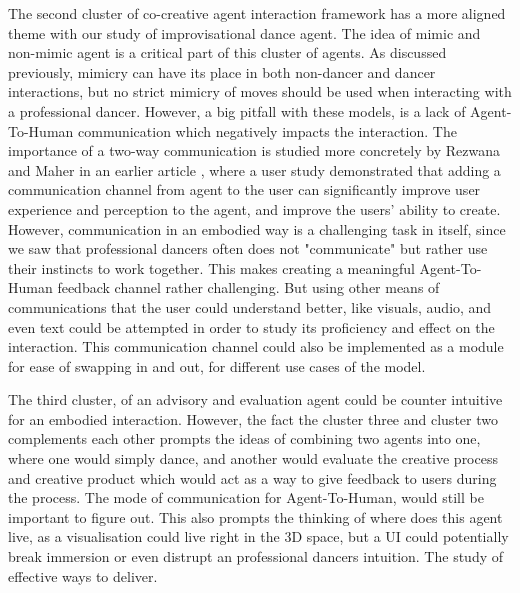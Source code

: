 \documentclass[final,5p,times,twocolumn,authoryear]{article}
\begin{document}
The second cluster of co-creative agent interaction framework has a more
aligned theme with our study of improvisational dance agent. The idea of
mimic and non-mimic agent is a critical part of this cluster of agents.
As discussed previously, mimicry can have its place in both non-dancer
and dancer interactions, but no strict mimicry of moves should be used
when interacting with a professional dancer. However, a big pitfall with
these models, is a lack of Agent-To-Human communication which negatively impacts
the interaction. The importance of a two-way communication is studied
more concretely by Rezwana and Maher in an earlier article
\cite{Rezwana2022}, where a user study demonstrated that adding a
communication channel from agent to the user can significantly improve
user experience and perception to the agent, and improve the users'
ability to create. However, communication in an embodied way is a
challenging task in itself, since we saw that professional dancers often
does not "communicate" but rather use their instincts to work together.
This makes creating a meaningful Agent-To-Human feedback channel rather
challenging. But using other means of communications that the user could
understand better, like visuals, audio, and even text could be attempted
in order to study its proficiency and effect on the interaction.  This
communication channel could also be implemented as a module for ease of
swapping in and out, for different use cases of the model.

The third cluster, of an advisory and evaluation agent could be counter
intuitive for an embodied interaction. However, the fact the cluster
three and cluster two complements each other prompts the ideas of
combining two agents into one, where one would simply dance, and another
would evaluate the creative process and creative product which would act
as a way to give feedback to users during the process. The mode of
communication for Agent-To-Human, would still be important to figure
out. This also prompts the thinking of where does this agent live, as a
visualisation could live right in the 3D space, but a UI could
potentially break immersion or even distrupt an professional dancers
intuition. The study of effective ways to deliver.

\end{document}
